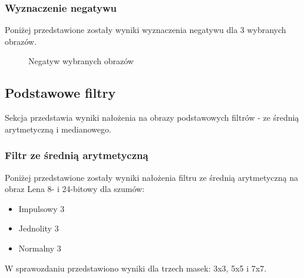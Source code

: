 \documentclass{classrep}
\begin{document}
\subsubsection{Wyznaczenie negatywu}
Poniżej przedstawione zostały wyniki wyznaczenia negatywu dla 3 wybranych obrazów.
\begin{figure}[H]%
    \centering
    \qquad
    \qquad
    \caption{Negatyw wybranych obrazów}%
\end{figure}


\subsection{Podstawowe filtry}
Sekcja przedstawia wyniki nałożenia na obrazy podstawowych filtrów - ze średnią arytmetyczną i medianowego.

\subsubsection{Filtr ze średnią arytmetyczną}
Poniżej przedstawione zostały wyniki nałożenia filtru ze średnią arytmetyczną na obraz Lena 8- i 24-bitowy dla szumów:
\begin{itemize}
\item Impulsowy 3
\item Jednolity 3
\item Normalny 3
\end{itemize}
W sprawozdaniu przedstawiono wyniki dla trzech masek: 3x3, 5x5 i 7x7.
\end{document}
